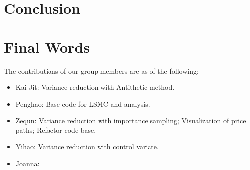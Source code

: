 \documentclass[12pt]{article}
\begin{document}
\section{Conclusion}

\section{Final Words}

The contributions of our group members are as of the following:
\begin{itemize}
\item Kai Jit: Variance reduction with Antithetic method.
\item Penghao: Base code for LSMC and analysis.
\item Zequn: Variance reduction with importance sampling; Visualization of price paths; Refactor code base.
\item Yihao: Variance reduction with control variate.
\item Joanna:
\end{itemize}

\printbibliography
\end{document}
